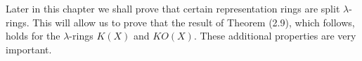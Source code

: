 Later in this chapter we shall prove that certain representation rings are split $\lambda$-rings. This will allow us to prove that the result of Theorem (2.9), which follows, holds for the $\lambda$-rings $K(X)$ and $KO(X)$. These additional properties are very important.

